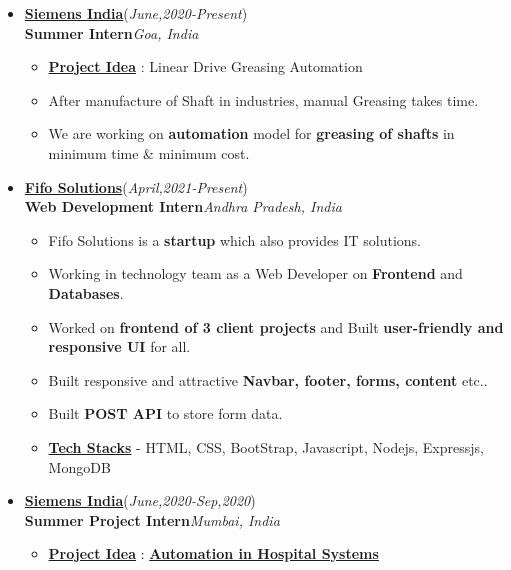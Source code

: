 \documentclass[10pt]{extarticle}
\begin{document}
\begin{itemize}
\item \href{https://www.linkedin.com/company/siemens/mycompany/verification/}{\textbf{Siemens India}}\hfill\hfill(\textit{June,2020-Present})\\
\textbf{Summer Intern}\hfill\hfill\textit{Goa, India}
     \begin{itemize}
         \item \underline{\textbf{Project Idea}} : Linear Drive Greasing Automation
         \item After manufacture of Shaft in industries, manual Greasing takes time.
         \item We are working on \textbf{automation} model for \textbf{greasing of shafts} in minimum time \& minimum cost.
     \end{itemize}
\item \href{https://www.linkedin.com/company/fifo-solutions/}{\textbf{Fifo Solutions}}\hfill\hfill(\textit{April,2021-Present})\\
\textbf{Web Development Intern}\hfill\hfill\textit{Andhra Pradesh, India}
    \begin{itemize}
        \item Fifo Solutions is a \textbf{startup} which also provides IT solutions.
        \item Working in technology team as a Web Developer on \textbf{Frontend} and \textbf{Databases}.
        \item Worked on \textbf{frontend of 3 client projects} and Built \textbf{user-friendly and responsive UI} for all.
        \item Built responsive and attractive \textbf{Navbar, footer, forms, content} etc..
        \item Built \textbf{POST API} to store form data.
        \item \underline{\textbf{Tech Stacks}} - HTML, CSS, BootStrap, Javascript, Nodejs, Expressjs, MongoDB
    \end{itemize}
\item \href{https://www.linkedin.com/company/siemens/mycompany/verification/}{\textbf{Siemens India}}\hfill\hfill(\textit{June,2020-Sep,2020})\\
\textbf{Summer Project Intern}\hfill\hfill\textit{Mumbai, India}
      \begin{itemize}
          \item \underline{\textbf{Project Idea}} : \href{https://github.com/PSoni8/Seimens-Project}{\textbf{Automation in Hospital Systems}}

\end{itemize}
\end{itemize}
\end{document}
